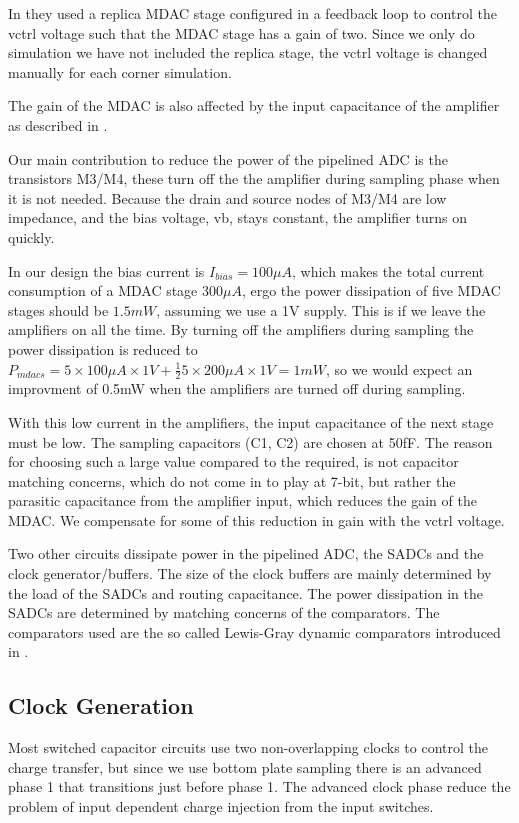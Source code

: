 In \cite{Shen07} they used a replica MDAC stage configured in a feedback
loop to control the vctrl voltage such that the MDAC stage has a gain
of two. Since we only do simulation we have not included the replica
stage, the  vctrl voltage is  changed manually for each corner simulation. 

The gain of the MDAC is also affected by the input capacitance of the
amplifier as described in \cite{Shen07}.

Our main contribution to reduce the power of the pipelined ADC is the
transistors M3/M4, these turn off the the amplifier during sampling
phase when it is not needed. Because the drain and source nodes of
M3/M4 are low impedance, and the bias voltage, vb, stays constant,
the amplifier turns on quickly. 

In our design the bias current is  $I_{bias} = 100 \mu A$, which makes
the total current consumption of a MDAC stage $300 \mu A$, ergo the
power dissipation of five MDAC stages should be $1.5 mW$, assuming we
use a 1V supply. This is if we leave
the amplifiers on all the time. By turning off the amplifiers during sampling
the power dissipation is reduced to $P_{mdacs} = 5 \times 100 \mu A \times 1V+ \frac{1}{2}{5
  \times 200 \mu A} \times 1V = 1mW$, so we would expect an improvment
of 0.5mW when the amplifiers are turned off during sampling.

With this low current in the amplifiers, the input capacitance of the
next stage must be low. The sampling capacitors (C1, C2) are chosen at
50fF. The reason for choosing such a large value
compared to the required, is not capacitor matching concerns, which do not
come in to play at 7-bit, but rather the parasitic capacitance from
the amplifier input, which reduces the gain of the MDAC. We
compensate for some of this reduction in gain with the vctrl voltage.

Two other circuits dissipate power in the pipelined ADC, the SADCs and
the clock generator/buffers. The size of the clock buffers are mainly determined by
the load of the SADCs and routing capacitance. The power dissipation
in the SADCs are
determined by matching concerns of the comparators. The comparators used are the so
called Lewis-Gray
dynamic comparators introduced in \cite{cho95}. 

\subsection{Clock Generation}
Most
switched capacitor circuits use two non-overlapping clocks to control
the charge transfer, but since
we use bottom plate sampling there is an advanced phase 1 that transitions just
before phase 1. The advanced clock phase reduce the problem of input dependent charge injection
from the input switches. 

